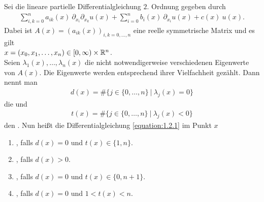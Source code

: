 \begin{df}

Sei die lineare partielle Differentialgleichung 
$2.$ Ordnung gegeben durch
\begin{align}\label{equation:1.2.1}
\sum \limits_{i,k= 0}^n a_{ik}(x) \ \partial_{x_i} \partial_{x_k} u(x)
+ \sum \limits_{i = 0}^n b_i(x) \ \partial_{x_i} u(x)
+ c(x) \ u(x).
\end{align}
Dabei ist $A(x) = (a_{ik}(x))_{i,k = 0,\dots,n}$ eine reelle symmetrische Matrix und es gilt\\
$x = (x_0, x_1, \dots, x_n) \in [0,\infty) \times \mathbb{R}^n$.\\
Seien $\lambda_1(x), \dots, \lambda_n(x)$ die nicht notwendigerweise verschiedenen Eigenwerte von $A(x)$.
Die Eigenwerte werden entsprechend ihrer Vielfachheit gezählt.
Dann nennt man
\begin{align*}
d(x) = \# \lbrace j \in \lbrace 0, \dots, n \rbrace \ | \ \lambda_j(x) = 0 \rbrace
\end{align*}
die  und 
\begin{align*}
t(x) = \# \lbrace j \in \lbrace 0, \dots, n \rbrace \ | \ \lambda_j(x) < 0 \rbrace
\end{align*}
den .
Nun heißt die Differentialgleichung \ref{equation:1.2.1} im Punkt $x$
\renewcommand{\labelenumi}{(\roman{enumi})}
\begin{enumerate}
\item {}, falls $d(x)= 0 $ und $t(x) \in \lbrace 1, n \rbrace$.

\item {}, falls $d(x) > 0$.

\item {}, falls $d(x)  = 0$ und $t(x) \in \lbrace 0, n+1 \rbrace$.

\item {}, falls $d(x) = 0 $ und $1 < t(x) < n$.
\end{enumerate}
\end{df}

